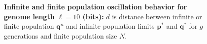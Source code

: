 \begin{figure}[H]
\begin{center}
{}


\caption{\textbf{Infinite and finite population oscillation behavior for genome length $\ell = 10$ (bits):} $d$ is
  distance between infinite or finite population ${\bm q}^n$ and infinite
  population limits ${{\bm p}^\ast}$ and ${{\bm q}^{\ast}}$ for $g$ generations and finite population size $N$.}
\label{oscillation_10d}
\end{center}
\end{figure}


